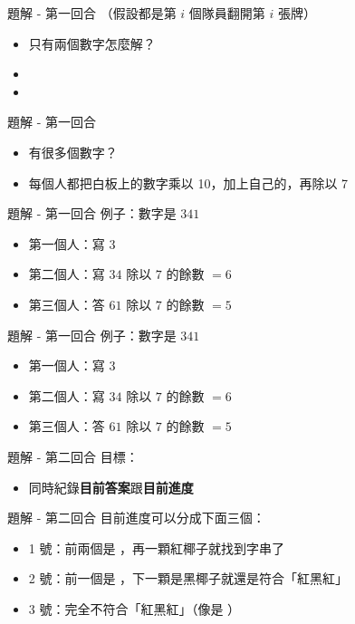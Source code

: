 \begin{frame}{題解 - 第一回合}
  （假設都是第 $i$ 個隊員翻開第 $i$ 張牌）
  \begin{itemize}
    \item 只有兩個數字怎麼解？
    \item{}
    \item{}
  \end{itemize}
\end{frame}

\begin{frame}{題解 - 第一回合}
  \begin{itemize}
    \item 有很多個數字？
    \item 每個人都把白板上的數字乘以 10，加上自己的，再除以 7
  \end{itemize}
\end{frame}

\begin{frame}{題解 - 第一回合}
  例子：數字是 $341$
  \begin{itemize}
    \item 第一個人：寫 $3$
    \item 第二個人：寫 $34$ 除以 $7$ 的餘數 $= 6$
    \item 第三個人：答 $61$ 除以 $7$ 的餘數 $= 5$
  \end{itemize}
\end{frame}

\begin{frame}{題解 - 第一回合}
  例子：數字是 $341$
  \begin{itemize}
    \item 第一個人：寫 $3$
    \item 第二個人：寫 $34$ 除以 $7$ 的餘數 $= 6$
    \item 第三個人：答 $61$ 除以 $7$ 的餘數 $= 5$
  \end{itemize}
\end{frame}

\begin{frame}{題解 - 第二回合}
  目標：
  \begin{itemize}
    \item 同時紀錄\textbf{目前答案}跟\textbf{目前進度}
  \end{itemize}
\end{frame}

\begin{frame}{題解 - 第二回合}
  目前進度可以分成下面三個：
  \begin{itemize}
    \item 1 號：前兩個是 ，再一顆紅椰子就找到字串了
    \item 2 號：前一個是 ，下一顆是黑椰子就還是符合「紅黑紅」
    \item 3 號：完全不符合「紅黑紅」（像是 ）
  \end{itemize}
\end{frame}

